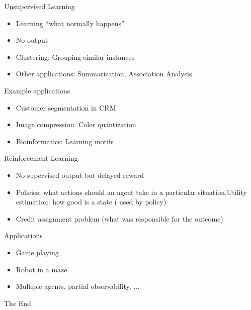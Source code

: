 \documentclass{beamer}
\begin{document}
\begin{frame}{Unsupervised Learning}
    \begin{itemize}
        \item Learning “what normally happens”
\item No output
\item Clustering: Grouping similar instances
\item Other applications: Summarization, Association Analysis. \end{itemize}
\begin{block}{Example applications}
\begin{itemize}
    \item Customer segmentation in CRM
\item Image compression: Color quantization
\item Bioinformatics: Learning motifs
\end{itemize}
\end{block}
\end{frame}

\begin{frame}{Reinforcement Learning}
    \begin{itemize}
        \item No supervised output but delayed reward
        \item Policies: what actions should an agent take in a particular situation.Utility estimation: how good is a state (used by policy)
        \item Credit assignment problem (what was responsible for the outcome) 
     \end{itemize}
     \begin{block}{Applications}
     \begin{itemize}
        \item Game playing
        \item Robot in a maze
        \item Multiple agents, partial observability, ...
     \end{itemize}
     \end{block}
\end{frame}

\begin{frame}
\huge{\centerline{The End}}
\end{frame}
\end{document}

